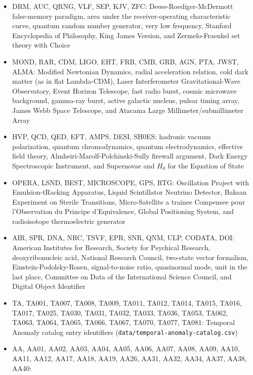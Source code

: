 \documentclass[10pt,letterpaper]{article}
\begin{document}
\begin{itemize}
  large language model, reinforcement learning, and International
  Mathematical Olympiad
\item
  DRM, AUC, QRNG, VLF, SEP, KJV, ZFC: Deese-Roediger-McDermott
  false-memory paradigm, area under the receiver-operating
  characteristic curve, quantum random number generator, very low
  frequency, Stanford Encyclopedia of Philosophy, King James Version,
  and Zermelo-Fraenkel set theory with Choice
\item
  MOND, RAR, CDM, LIGO, EHT, FRB, CMB, GRB, AGN, PTA, JWST, ALMA:
  Modified Newtonian Dynamics, radial acceleration relation, cold dark
  matter (as in flat Lambda-CDM), Laser Interferometer
  Gravitational-Wave Observatory, Event Horizon Telescope, fast radio
  burst, cosmic microwave background, gamma-ray burst, active galactic
  nucleus, pulsar timing array, James Webb Space Telescope, and Atacama
  Large Millimeter/submillimeter Array
\item
  HVP, QCD, QED, EFT, AMPS, DESI, SH0ES: hadronic vacuum polarization,
  quantum chromodynamics, quantum electrodynamics, effective field
  theory, Almheiri-Marolf-Polchinski-Sully firewall argument, Dark
  Energy Spectroscopic Instrument, and Supernovae and \(H_0\) for the
  Equation of State
\item
  OPERA, LSND, BEST, MICROSCOPE, GPS, RTG: Oscillation Project with
  Emulsion-tRacking Apparatus, Liquid Scintillator Neutrino Detector,
  Baksan Experiment on Sterile Transitions, Micro-Satellite a trainee
  Compensee pour l'Observation du Principe d'Equivalence, Global
  Positioning System, and radioisotope thermoelectric generator
\item
  AIR, SPR, DNA, NRC, TSVF, EPR, SNR, QNM, ULP, CODATA, DOI: American
  Institutes for Research, Society for Psychical Research,
  deoxyribonucleic acid, National Research Council, two-state vector
  formalism, Einstein-Podolsky-Rosen, signal-to-noise ratio, quasinormal
  mode, unit in the last place, Committee on Data of the International
  Science Council, and Digital Object Identifier
\item
  TA, TA001, TA007, TA008, TA009, TA011, TA012, TA014, TA015, TA016,
  TA017, TA025, TA030, TA031, TA032, TA033, TA036, TA053, TA062, TA063,
  TA064, TA065, TA066, TA067, TA070, TA077, TA081: Temporal Anomaly
  catalog entry identifiers (\texttt{data/\allowbreak{}temporal-\allowbreak{}anomaly-\allowbreak{}catalog.\allowbreak{}csv})
\item
  AA, AA01, AA02, AA03, AA04, AA05, AA06, AA07, AA08, AA09, AA10, AA11,
  AA12, AA17, AA18, AA19, AA26, AA31, AA32, AA34, AA37, AA38, AA40:

\end{itemize}
\end{document}

